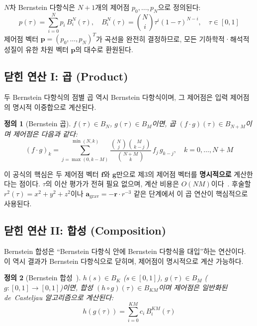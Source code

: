 \documentclass[11pt]{article}
\newtheorem{definition}{정의}
\begin{document}
$N$차 Bernstein 다항식은 $N+1$개의 제어점 $p_0, \ldots, p_N$으로 정의된다:
\begin{equation}
  p(\tau) = \sum_{i=0}^N p_i \, B_i^N(\tau), \quad
  B_i^N(\tau) = \binom{N}{i}\tau^i(1-\tau)^{N-i},\quad \tau\in[0,1]
  \label{eq:bernstein-def}
\end{equation}
제어점 벡터 $\mathbf{p} = (p_0, \ldots, p_N)^T$가 곡선을 완전히 결정하므로,
모든 기하학적·해석적 성질이 유한 차원 벡터 $\mathbf{p}$의 대수로 환원된다.

\subsection{닫힌 연산 I: 곱 (Product)}
\label{ssec:product}

두 Bernstein 다항식의 점별 곱 역시 Bernstein 다항식이며,
그 제어점은 입력 제어점의 명시적 이중합으로 계산된다.

\begin{definition}[Bernstein 곱]
$f(\tau) \in B_N$, $g(\tau) \in B_M$이면, 곱 $(f \cdot g)(\tau) \in B_{N+M}$이며
제어점은 다음과 같다:
\begin{equation}
  (f \cdot g)_k = \sum_{j=\max(0,k-M)}^{\min(N,k)}
    \frac{\binom{N}{j}\binom{M}{k-j}}{\binom{N+M}{k}} \, f_j \, g_{k-j},
  \quad k = 0, \ldots, N+M
  \label{eq:product}
\end{equation}
\end{definition}

이 공식의 핵심은 두 제어점 벡터 $\mathbf{f}$와 $\mathbf{g}$만으로
제3의 제어점 벡터를 \textbf{명시적으로} 계산한다는 점이다.
$\tau$의 이산 평가가 전혀 필요 없으며,
계산 비용은 $O(NM)$이다~\cite{farouki2012bernstein}.
후술할 $r^2(\tau) = x^2 + y^2 + z^2$이나
$\mathbf{a}_\mathrm{grav} = -\mathbf{r} \cdot r^{-3}$ 같은 단계에서
이 곱 연산이 핵심적으로 사용된다.

\subsection{닫힌 연산 II: 합성 (Composition)}
\label{ssec:composition}

Bernstein 합성은 ``Bernstein 다항식 안에 Bernstein 다항식을 대입''하는 연산이다.
이 역시 결과가 Bernstein 다항식으로 닫히며, 제어점이 명시적으로 계산 가능하다.

\begin{definition}[Bernstein 합성~\cite{derose1988composing}]
$h(s) \in B_K$ ($s \in [0,1]$), $g(\tau) \in B_M$ ($g : [0,1] \to [0,1]$)이면,
합성 $(h \circ g)(\tau) \in B_{KM}$이며 제어점은 일반화된 de~Casteljau 알고리즘으로 계산된다:
\begin{equation}
  h(g(\tau)) = \sum_{i=0}^{KM} c_i \, B_i^{KM}(\tau)
  \label{eq:composition}
\end{equation}
\end{definition}
\end{document}
